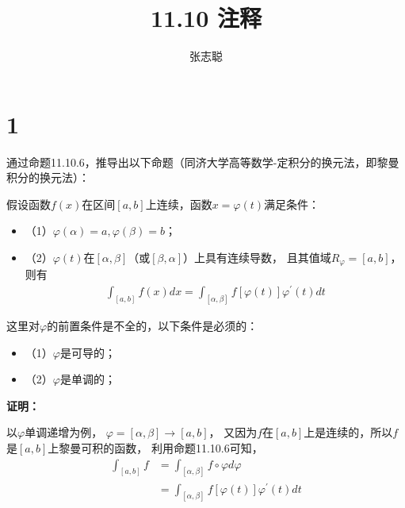\documentclass{article}
\begin{document}
\title{11.10 注释}
\author{张志聪}
\maketitle

\section*{1}

\begin{zremark}
  通过命题11.10.6，推导出以下命题（同济大学高等数学-定积分的换元法，即黎曼积分的换元法）：

  假设函数$f(x)$在区间$[a, b]$上连续，函数$x = \varphi(t)$满足条件：
  \begin{itemize}
    \item （1）$\varphi(\alpha) = a, \varphi(\beta) = b$；
    \item （2）$\varphi(t)$在$[\alpha, \beta]$（或$[\beta, \alpha]$）上具有连续导数，
          且其值域$R_{\varphi} = [a, b]$，则有
          \begin{align*}
            \int_{[a, b]} f(x) dx = \int_{[\alpha, \beta]} f[\varphi(t)]\varphi^\prime(t) dt
          \end{align*}
  \end{itemize}
\end{zremark}

这里对$\varphi$的前置条件是不全的，以下条件是必须的：
\begin{itemize}
  \item （1）$\varphi$是可导的；
  \item （2）$\varphi$是单调的；
\end{itemize}

\textbf{证明：}

以$\varphi$单调递增为例，
$\varphi = [\alpha, \beta] \to [a, b]$，
又因为$f$在$[a, b]$上是连续的，所以$f$是$[a, b]$上黎曼可积的函数，
利用命题11.10.6可知，
\begin{align*}
  \int_{[a, b]} f
   & = \int_{[\alpha, \beta]} f \circ \varphi d\varphi \\
   & = \int_{[\alpha, \beta]} f[\varphi(t)]\varphi^\prime(t) dt
\end{align*}
\end{document}

